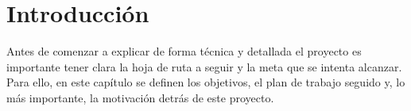 \chapter{Introducción}
\label{cap:introduccion}

Antes de comenzar a explicar de forma técnica y detallada el proyecto es importante tener clara la hoja de ruta a seguir y la meta que se intenta alcanzar. Para ello, en este capítulo se definen los objetivos, el plan de trabajo seguido y, lo más importante, la motivación detrás de este proyecto.





